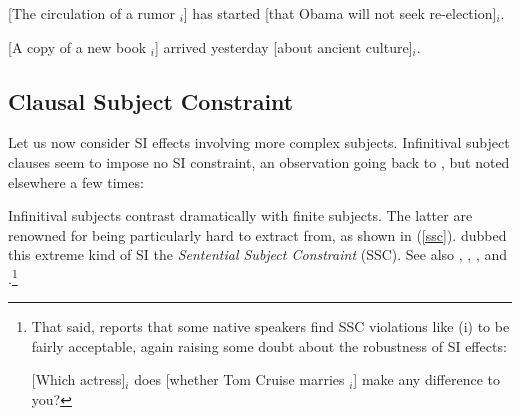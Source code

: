 \documentclass[output=paper
 	        ,biblatex
                ,babelshorthands
                ,newtxmath
                ,draftmode
                ,colorlinks, citecolor=brown
]{langscibook}
\begin{document}
\eal \label{subxxx}
\ex {}[The circulation of a rumor \spc$_i$]
has started [that Obama will not seek re-election]$_i$.

\ex {}[A  copy of a new book \spc$_i$] arrived
yesterday [about ancient  culture]$_i$.

\zl


\subsection{Clausal Subject Constraint}

Let us now consider SI effects involving more complex subjects.
Infinitival subject clauses seem to impose no SI constraint, an observation going
back to \citet{kunotakamib}, but noted elsewhere a few times:

\eal \label{vpsi}


\zl




\noindent
Infinitival subjects contrast dramatically with finite  subjects. The latter are renowned for being particularly hard to extract from, as  shown in  (\ref{ssc}).
  \citet{Ross67} dubbed this extreme kind of SI the  \emph{Sentential Subject Constraint} (SSC). See also  \citet{chomsky73}, \citet{huang82},  \citet{Chomsky86b}, and \citet{freidin92}.\footnote{That said, \citet{chavessubj} reports that some native speakers find SSC violations like  (i) to be fairly acceptable, again raising some doubt about the robustness of  SI effects:

\ea
{}[Which actress]$_i$ does [whether Tom Cruise marries \spc$_i$] make any difference to you?
\zlast
}


\eal \label{ssc}
\end{document}

